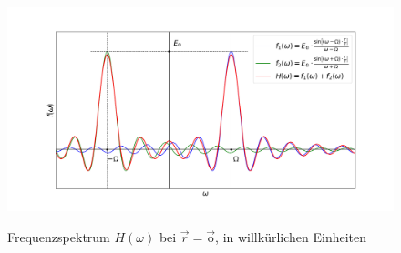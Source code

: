 \documentclass[german,  %
parskip=full,  %
]{scrartcl}
\begin{document}
\begin{figure}[h!]\centering
\includegraphics[scale=0.4]{Frequenzspektrum.png}
\label{Frequenzspqktrum}
\caption{Frequenzspektrum \(H(\omega)\) bei \(\vec{r} = \vec{\mathrm{o}}\), in willkürlichen Einheiten}
\end{figure}
\end{document}
